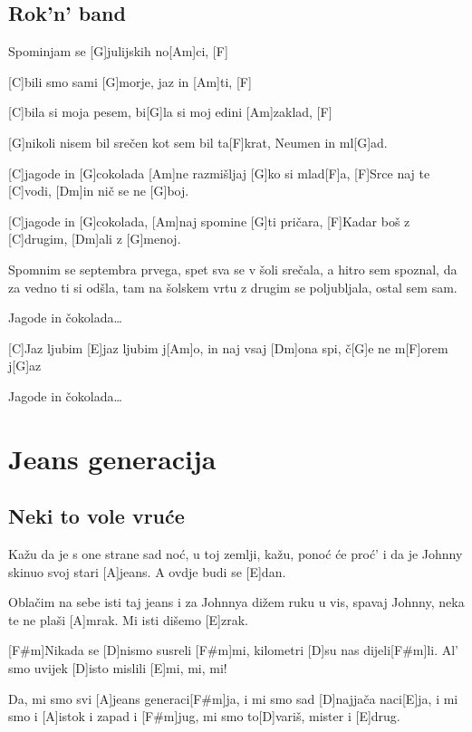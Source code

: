 \documentclass[a4paper,12pt]{article}
\begin{document}
\begin{multicols}{2}
\subsection*{Rok'n' band}
\begin{guitar}
[C]Spominjam se [G]julijskih no[Am]ci,   [F]

[C]bili smo sami [G]morje, jaz in [Am]ti,   [F]

[C]bila si moja pesem, bi[G]la si moj edini [Am]zaklad, [F]

[G]nikoli nisem bil srečen kot sem bil ta[F]krat,
Neumen in ml[G]ad.


[C]jagode in [G]cokolada [Am]ne razmišljaj [G]ko si mlad[F]a,
[F]Srce naj te [C]vodi,
[Dm]in nič se ne [G]boj.


[C]jagode in [G]cokolada, [Am]naj spomine [G]ti pričara,
[F]Kadar boš z [C]drugim,
[Dm]ali z [G]menoj.


Spomnim se septembra prvega,
spet sva se v šoli srečala,
a hitro sem spoznal, da za vedno ti si odšla,
tam na šolskem vrtu
z drugim se poljubljala, ostal sem sam.


Jagode in čokolada…


[C]Jaz ljubim [E]jaz ljubim j[Am]o,
in naj vsaj [Dm]ona spi, č[G]e ne m[F]orem j[G]az


Jagode in čokolada…

\end{guitar}
\section{Jeans generacija}
\subsection*{Neki to vole vruće}
\begin{guitar}
[E]Kažu da je s one strane sad noć,
u toj zemlji, kažu, ponoć će proć'
i da je Johnny skinuo svoj stari [A]jeans.
A ovdje budi se [E]dan.


Oblačim na sebe isti taj jeans
i za Johnnya dižem ruku u vis,
spavaj Johnny, neka te ne plaši [A]mrak.
Mi isti dišemo [E]zrak.



[F#m]Nikada se [D]nismo susreli [F#m]mi,
kilometri [D]su nas dijeli[F#m]li.
Al' smo uvijek [D]isto mislili [E]mi, mi, mi!

Da, mi smo svi [A]jeans generaci[F#m]ja,
i mi smo sad [D]najjača naci[E]ja,
i mi smo i [A]istok i zapad i [F#m]jug,
mi smo to[D]variš, mister i [E]drug.



\end{guitar}
\end{multicols}
\end{document}
